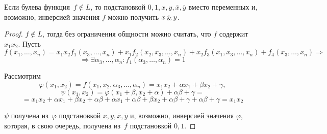 \begin{lemma}
Если булева функция~$f \notin L$, то подстановкой $0, 1, x, y, \overline x, \overline y$ вместо переменных и, возможно, инверсией значения $f$ можно получить $x \mathop{\&} y$.
\end{lemma}
\begin{proof}
$f \notin L$, тогда без ограничения общности можно считать, что $f$ содержит $x_1 x_2$.
Пусть
\begin{equation*}
f(x_1, \ldots, x_n) = x_1 x_2 f_1(x_3, \ldots, x_n) + x_1 f_2(x_2, x_3, \ldots, x_n) + x_2 f_3(x_1, x_3, \ldots, x_n) + f_4(x_3, \ldots, x_n) \Rightarrow
\end{equation*}
\begin{equation*}
\Rightarrow \exists \alpha_3, \ldots, \alpha_n \colon f_1(\alpha_3, \ldots, \alpha_n) = 1
\end{equation*}

Рассмотрим
\begin{equation*}
\varphi(x_1, x_2) = f(x_1, x_2, \alpha_3, \ldots, \alpha_n) = x_1 x_2 + \alpha x_1 + \beta x_2 + \gamma,
\end{equation*}
\begin{equation*}
\psi(x_1, x_2) = \varphi(x_1 + \beta, x_2 + \alpha) + \alpha\beta + \gamma =
\end{equation*}
\begin{equation*}
= x_1 x_2 + \alpha x_1 + \beta x_2 + \alpha\beta + \alpha x_1 + \alpha\beta + \beta x_2 + \alpha\beta + \gamma + \alpha\beta + \gamma =
x_1 x_2
\end{equation*}

$\psi$ получена из~$\varphi$ подстановкой $x, y, \overline x, \overline y$ и, возможно, инверсией значения $\varphi$, которая, в свою очередь, получена из~$f$ подстановкой $0, 1$.
\end{proof}
